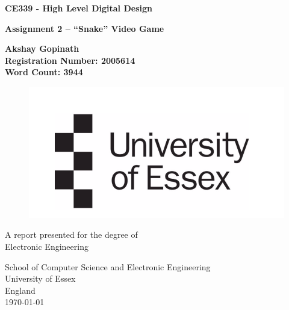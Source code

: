 \documentclass[aps, secnumarabic, balancelastpage, asmath, amssymb, nofootinbib, floatfix,]{revtex4-2}
\begin{document}
    \begin{titlepage}
   \begin{center}
       \vspace*{1cm}

	\Huge
       \textbf{CE339 - High Level Digital Design}

       \vspace{0.5cm}
       
       \LARGE
        \textbf{Assignment 2 -- ``Snake'' Video Game}
            
       \vspace{1.5cm}

       \textbf{Akshay Gopinath}\\
       \textbf{Registration Number: 2005614}\\
       \textbf{Word Count: 3944}\\

       \vfill
        \begin{figure}[h]
        
        \includegraphics[scale = 0.85]{University}
        
   	\end{figure}
        \vfill
            
       A report presented for the degree of\\
       Electronic Engineering
            
       \vspace{1cm}
     
            
       School of Computer Science and Electronic Engineering\\
       University of Essex\\
       England\\
       \today

   \end{center}
\end{titlepage}
\end{document}
